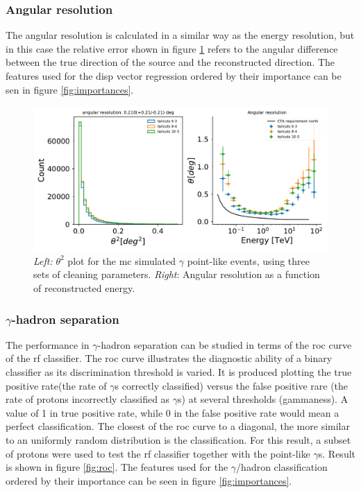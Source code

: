 \documentclass[main.tex]{subfiles}
\begin{document}
\subsubsection{Angular resolution}

The angular resolution is calculated in a similar way as the energy resolution, but in this case the relative error shown in figure \ref{fig:angres} refers to the angular difference between the true direction of the source and the reconstructed direction. The features used for the disp vector regression ordered by their importance can be sen in figure \ref{fig:importances}.


\begin{figure}
\centering
 \includegraphics[width=1\textwidth]{Pictures/angular_resolution.pdf}
  \caption{\textit{Left:} $\theta^2$ plot for the \gls{mc} simulated $\gamma$ point-like events, using three sets of cleaning parameters. \textit{Right}: Angular resolution as a function of reconstructed energy.}
    \label{fig:angres}
\end{figure}

\subsubsection{$\gamma$-hadron separation}

The performance in $\gamma$-hadron separation can be studied in terms of the \gls{roc} curve of the \gls{rf} classifier. The \gls{roc} curve illustrates the diagnostic ability of a binary classifier as its discrimination threshold is varied. It is produced plotting the true positive rate(the rate of $\gamma$s correctly classified) versus the false positive rare (the rate of protons incorrectly classified as $\gamma$s) at several thresholds (gammaness). A value of 1 in true positive rate, while 0 in the false positive rate would mean a perfect classification. The closest of the \gls{roc} curve to a diagonal, the more similar to an uniformly random distribution is the classification. For this result, a subset of protons were used to test the \gls{rf} classifier together with the point-like $\gamma$s. Result is shown in figure \ref{fig:roc}. The features used for the $\gamma$/hadron classification ordered by their importance can be seen in figure \ref{fig:importances}.
\end{document}
